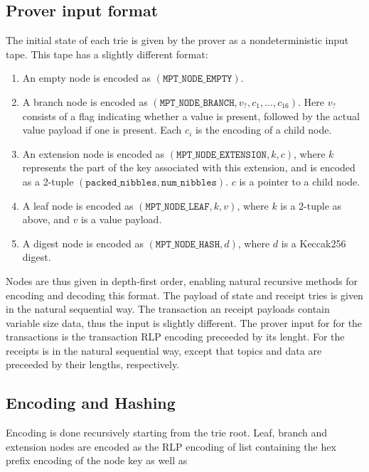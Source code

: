\subsection{Prover input format}

The initial state of each trie is given by the prover as a nondeterministic input tape. This tape has a slightly different format:
\begin{enumerate}
  \item An empty node is encoded as $(\texttt{MPT\_NODE\_EMPTY})$.
  \item A branch node is encoded as $(\texttt{MPT\_NODE\_BRANCH}, v_?, c_1, \dots, c_{16})$. Here $v_?$ consists of a flag indicating whether a value is present, followed by the actual value payload if one is present. Each $c_i$ is the encoding of a child node.
  \item An extension node is encoded as $(\texttt{MPT\_NODE\_EXTENSION}, k, c)$, where $k$ represents the part of the key associated with this extension, and is encoded as a 2-tuple $(\texttt{packed\_nibbles}, \texttt{num\_nibbles})$. $c$ is a pointer to a child node.
  \item A leaf node is encoded as $(\texttt{MPT\_NODE\_LEAF}, k, v)$, where $k$ is a 2-tuple as above, and $v$ is a value payload.
  \item A digest node is encoded as $(\texttt{MPT\_NODE\_HASH}, d)$, where $d$ is a Keccak256 digest.
\end{enumerate}
Nodes are thus given in depth-first order, enabling natural recursive methods for encoding and decoding this format.
The payload of state and receipt tries is given in the natural sequential way. The transaction an receipt payloads contain variable size data, thus the input is slightly different. The prover input for for the transactions is the transaction RLP encoding preceeded by its lenght. For the receipts is in the natural sequential way, except that topics and data are preceeded by their lengths, respectively.

\subsection{Encoding and Hashing}

Encoding is done recursively starting from the trie root. Leaf, branch and extension nodes are encoded as the RLP encoding of list containing the hex prefix encoding of the node key as well as

